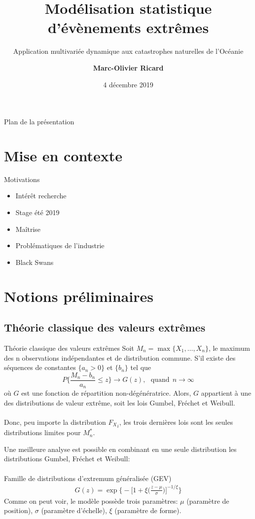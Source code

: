 \documentclass[aspectratio=169, 12pt, french]{beamer}
\title[\hyperlink{start}{ACT-2101}]{\Large Modélisation statistique d'évènements extrêmes}
\subtitle{\normalsize Application multivariée dynamique aux catastrophes naturelles de l'Océanie}
\author{\large \textbf{Marc-Olivier Ricard}}
\institute{\normalsize Sous la supervision de \\ Marie-Pier Côté}
\date{\normalsize 4 décembre 2019}
\begin{document}
\begin{frame}
\titlepage
\end{frame}


\begin{frame}{Plan de la présentation}
\tableofcontents
\end{frame}

\section{Mise en contexte}



\begingroup
\large
\begin{frame}{Motivations}
\begin{itemize}
	\item Intérêt recherche
	\item Stage été 2019
	\item Maîtrise
	\item Problématiques de l'industrie
	\item Black Swans
\end{itemize}
\end{frame}
\endgroup


\section{Notions préliminaires}

\subsection{Théorie classique des valeurs extrêmes}
\begin{frame}{Théorie classique des valeurs extrêmes}
Soit $M_n = \max\{X_1, \dots, X_n\}$, le maximum des n observations indépendantes et de distribution commune. 
S'il existe des séquences de constantes $\{a_n > 0\}$ et $\{b_n\}$ tel que $$P\Bigg\{\frac{M_n - b_n}{a_n} \le z \Bigg\}\to G(z), \ \ \  \text{quand} \ \ {n \to \infty}$$ où $G$ est une fonction de répartition non-dégénératrice. Alors, $G$ appartient à une des distributions de valeur extrême, soit les lois Gumbel, Fréchet et Weibull. \\~\\
Donc, peu importe la distribution ${F_X}_i$, les trois dernières lois sont les seules distributions limites pour $M^*_n$.
\end{frame}

\begin{frame}
Une meilleure analyse est possible en combinant en une seule distribution les distributions Gumbel, Fréchet et Weibull:\\~\\
Famille de distributions d'extremum généralisée (GEV)
\begin{equation}
\begin{gathered}
G(z) = \exp \Bigg\{ - \Big[ 1 +\xi\Big(\frac{z-\mu}{\sigma}\Big) \Big]^{-1/\xi}  \Bigg\}
\end{gathered}
\end{equation} 
Comme on peut voir, le modèle possède trois paramètres: $\mu$ (paramètre de position), $\sigma$ (paramètre d'échelle), $\xi$ (paramètre de forme).
\end{frame}
\end{document}
